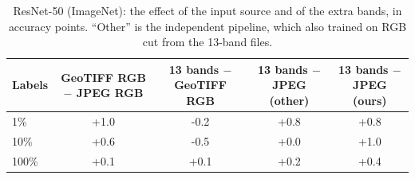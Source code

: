 \begin{table}[t]
\centering
\caption{ResNet-50 (ImageNet): the effect of the input source and of the extra bands, in accuracy points. ``Other'' is the independent pipeline, which also trained on RGB cut from the 13-band files.}
\label{tab:band_control}
\footnotesize
\begin{tabular}{lcccc}
\toprule
Labels & GeoTIFF RGB $-$ JPEG RGB & 13 bands $-$ GeoTIFF RGB & 13 bands $-$ JPEG (other) & 13 bands $-$ JPEG (ours) \\
\midrule
1\% & +1.0 & -0.2 & +0.8 & +0.8 \\
10\% & +0.6 & -0.5 & +0.0 & +1.0 \\
100\% & +0.1 & +0.1 & +0.2 & +0.4 \\
\bottomrule
\end{tabular}
\end{table}
